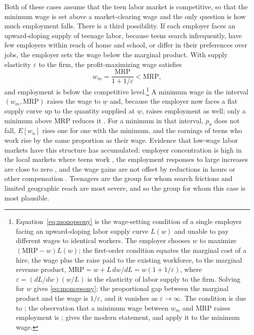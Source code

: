 \documentclass[12pt]{article}
\begin{document}
Both of these cases assume that the teen labor market is competitive, so that the minimum wage is set above a market-clearing wage and the only question is how much employment falls. There is a third possibility. If each employer faces an upward-sloping supply of teenage labor, because teens search infrequently, have few employers within reach of home and school, or differ in their preferences over jobs, the employer sets the wage below the marginal product. With supply elasticity $\varepsilon$ to the firm, the profit-maximizing wage satisfies
\begin{equation}
w_m = \frac{\text{MRP}}{1 + 1/\varepsilon} < \text{MRP},
\label{eq:monopsony}
\end{equation}
and employment is below the competitive level.\footnote{Equation~\eqref{eq:monopsony} is the wage-setting condition of a single employer facing an upward-sloping labor supply curve $L(w)$ and unable to pay different wages to identical workers. The employer chooses $w$ to maximize $(\text{MRP} - w)L(w)$; the first-order condition equates the marginal cost of a hire, the wage plus the raise paid to the existing workforce, to the marginal revenue product, $\text{MRP} = w + L\,dw/dL = w(1 + 1/\varepsilon)$, where $\varepsilon = (dL/dw)(w/L)$ is the elasticity of labor supply to the firm. Solving for $w$ gives \eqref{eq:monopsony}; the proportional gap between the marginal product and the wage is $1/\varepsilon$, and it vanishes as $\varepsilon \to \infty$. The condition is due to \citet{robinson1933}; the observation that a minimum wage between $w_m$ and MRP raises employment is \citet{stigler1946}; \citet[chapter 2]{manning2003} gives the modern statement, and \citet{card1995} apply it to the minimum wage.} A minimum wage in the interval $(w_m, \text{MRP})$ raises the wage to $\underline{w}$ and, because the employer now faces a flat supply curve up to the quantity supplied at $\underline{w}$, raises employment as well; only a minimum above MRP reduces it \citep{stigler1946,manning2003}. For a minimum in that interval, $p_u$ does not fall, $E[w_u]$ rises one for one with the minimum, and the earnings of teens who work rise by the same proportion as their wage. Evidence that low-wage labor markets have this structure has accumulated: employer concentration is high in the local markets where teens work \citep{azar2019}, the employment responses to large increases are close to zero \citep{cengiz2019}, and the wage gains are not offset by reductions in hours or other compensation \citep{dube2019}. Teenagers are the group for whom search frictions and limited geographic reach are most severe, and so the group for whom this case is most plausible.
\end{document}
